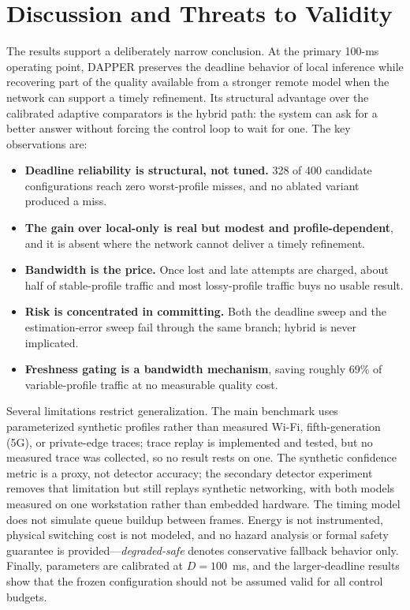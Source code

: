 \documentclass[conference,a4paper]{IEEEtran}
\begin{document}
\section{Discussion and Threats to Validity}
The results support a deliberately narrow conclusion. At the primary 100-ms operating point, DAPPER preserves the deadline behavior of local inference while recovering part of the quality available from a stronger remote model when the network can support a timely refinement. Its structural advantage over the calibrated adaptive comparators is the hybrid path: the system can ask for a better answer without forcing the control loop to wait for one. The key observations are:

\begin{itemize}\setlength{\itemsep}{0pt}\setlength{\parskip}{0pt}
    \item \textbf{Deadline reliability is structural, not tuned.} 328 of 400 candidate configurations reach zero worst-profile misses, and no ablated variant produced a miss.
    \item \textbf{The gain over local-only is real but modest and profile-dependent}, and it is absent where the network cannot deliver a timely refinement.
    \item \textbf{Bandwidth is the price.} Once lost and late attempts are charged, about half of stable-profile traffic and most lossy-profile traffic buys no usable result.
    \item \textbf{Risk is concentrated in committing.} Both the deadline sweep and the estimation-error sweep fail through the same branch; hybrid is never implicated.
    \item \textbf{Freshness gating is a bandwidth mechanism}, saving roughly 69\% of variable-profile traffic at no measurable quality cost.
\end{itemize}

Several limitations restrict generalization. The main benchmark uses parameterized synthetic profiles rather than measured Wi-Fi, fifth-generation (5G), or private-edge traces; trace replay is implemented and tested, but no measured trace was collected, so no result rests on one. The synthetic confidence metric is a proxy, not detector accuracy; the secondary detector experiment removes that limitation but still replays synthetic networking, with both models measured on one workstation rather than embedded hardware. The timing model does not simulate queue buildup between frames. Energy is not instrumented, physical switching cost is not modeled, and no hazard analysis or formal safety guarantee is provided---\emph{degraded-safe} denotes conservative fallback behavior only. Finally, parameters are calibrated at $D=100$~ms, and the larger-deadline results show that the frozen configuration should not be assumed valid for all control budgets.
\end{document}
